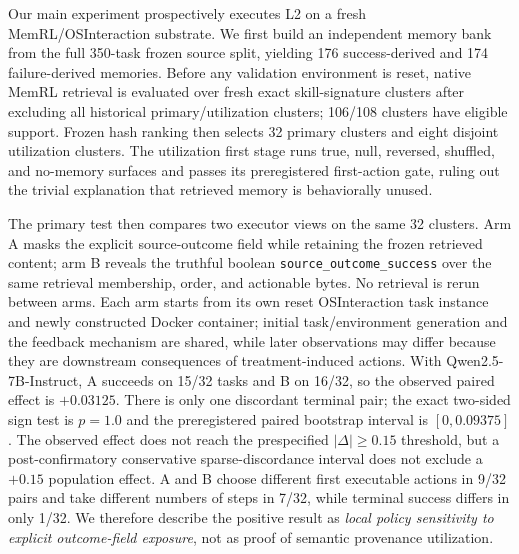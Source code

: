 Our main experiment prospectively executes L2 on a fresh MemRL/OSInteraction substrate. We first build an independent memory bank from the full 350-task frozen source split, yielding 176 success-derived and 174 failure-derived memories. Before any validation environment is reset, native MemRL retrieval is evaluated over fresh exact skill-signature clusters after excluding all historical primary/utilization clusters; 106/108 clusters have eligible support. Frozen hash ranking then selects 32 primary clusters and eight disjoint utilization clusters. The utilization first stage runs true, null, reversed, shuffled, and no-memory surfaces and passes its preregistered first-action gate, ruling out the trivial explanation that retrieved memory is behaviorally unused.

The primary test then compares two executor views on the same 32 clusters. Arm A masks the explicit source-outcome field while retaining the frozen retrieved content; arm B reveals the truthful boolean \texttt{source\_outcome\_success} over the same retrieval membership, order, and actionable bytes. No retrieval is rerun between arms. Each arm starts from its own reset OSInteraction task instance and newly constructed Docker container; initial task/environment generation and the feedback mechanism are shared, while later observations may differ because they are downstream consequences of treatment-induced actions. With Qwen2.5-7B-Instruct, A succeeds on 15/32 tasks and B on 16/32, so the observed paired effect is $+0.03125$. There is only one discordant terminal pair; the exact two-sided sign test is $p=1.0$ and the preregistered paired bootstrap interval is $[0,0.09375]$. The observed effect does not reach the prespecified $|\Delta|\geq0.15$ threshold, but a post-confirmatory conservative sparse-discordance interval does not exclude a $+0.15$ population effect. A and B choose different first executable actions in 9/32 pairs and take different numbers of steps in 7/32, while terminal success differs in only 1/32. We therefore describe the positive result as \emph{local policy sensitivity to explicit outcome-field exposure}, not as proof of semantic provenance utilization.

